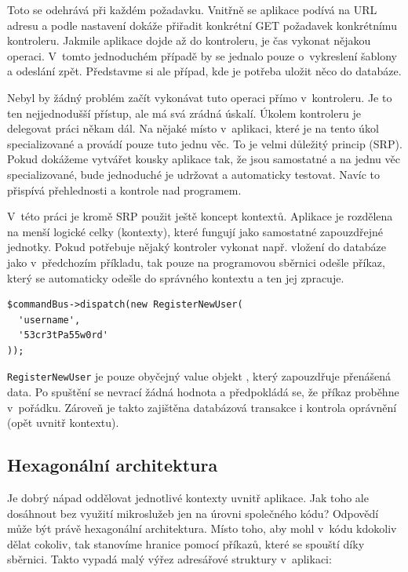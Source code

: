 Toto se odehrává při každém požadavku. Vnitřně se aplikace podívá na URL adresu a podle nastavení dokáže přiřadit konkrétní GET požadavek konkrétnímu kontroleru. Jakmile aplikace dojde až do kontroleru, je čas vykonat nějakou operaci. V~tomto jednoduchém případě by se jednalo pouze o~vykreslení šablony a odeslání zpět. Představme si ale případ, kde je potřeba uložit něco do databáze.

Nebyl by žádný problém začít vykonávat tuto operaci přímo v~kontroleru. Je to ten nejjednodušší přístup, ale má svá zrádná úskalí. Úkolem kontroleru je delegovat práci někam dál. Na nějaké místo v~aplikaci, které je na tento úkol specializované a provádí pouze tuto jednu věc. To je velmi důležitý princip (SRP). Pokud dokážeme vytvářet kousky aplikace tak, že jsou samostatné a na jednu věc specializované, bude jednoduché je udržovat a automaticky testovat. Navíc to přispívá přehlednosti a kontrole nad programem.

V~této práci je kromě SRP použit ještě koncept kontextů. Aplikace je rozdělena na menší logické celky (kontexty), které fungují jako samostatné zapouzdřejné jednotky. Pokud potřebuje nějaký kontroler vykonat např. vložení do databáze jako v~předchozím příkladu, tak pouze na programovou sběrnici odešle příkaz, který se automaticky odešle do správného kontextu a ten jej zpracuje.

\begin{verbatim}
$commandBus->dispatch(new RegisterNewUser(
  'username',
  '53cr3tPa55w0rd'
));
\end{verbatim}

\texttt{RegisterNewUser} je pouze obyčejný value objekt \cite{valueobject}, který zapouzdřuje přenášená data. Po spuštění se nevrací žádná hodnota a předpokládá se, že příkaz proběhne v~pořádku. Zároveň je takto zajištěna databázová transakce i kontrola oprávnění (opět uvnitř kontextu).

\subsection{Hexagonální architektura}
Je dobrý nápad oddělovat jednotlivé kontexty uvnitř aplikace. Jak toho ale dosáhnout bez využití mikroslužeb jen na úrovni společného kódu? Odpovědí může být právě hexagonální architektura. Místo toho, aby mohl v~kódu kdokoliv dělat cokoliv, tak stanovíme hranice pomocí příkazů, které se spouští díky sběrnici. Takto vypadá malý výřez adresářové struktury v~aplikaci:


